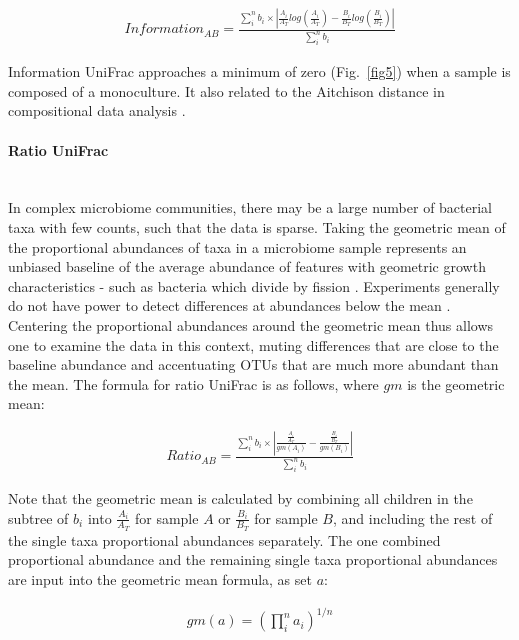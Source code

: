 \documentclass[10pt,letterpaper]{article}
\begin{document}
\begin{align*}
Information_{AB} = \frac{\sum_{i}^{n} b_{i} \times \left| \frac{A_{i}}{A_{T}}log\left(\frac{A_{i}}{A_{T}}\right) - \frac{B_{i}}{B_{T}}log\left(\frac{B_{i}}{B_{T}}\right) \right|}{\sum_{i}^{n} b_{i}}
\end{align*}

Information UniFrac approaches a minimum of zero (Fig.~\ref{fig5}) when a sample is composed of a monoculture. It also related to the Aitchison distance in compositional data analysis \cite{egozcue2011evidence}.

\paragraph{Ratio UniFrac}\mbox{}\\
In complex microbiome communities, there may be a large number of bacterial taxa with few counts, such that the data is sparse. Taking the geometric mean of the proportional abundances of taxa in a microbiome sample represents an unbiased baseline of the average abundance of features with geometric growth characteristics - such as bacteria which divide by fission \cite{aitchison1982statistical}. Experiments generally do not have power to detect differences at abundances below the mean \cite{fernandes2013anova}. Centering the proportional abundances around the geometric mean thus allows one to examine the data in this context, muting differences that are close to the baseline abundance and accentuating OTUs that are much more abundant than the mean. The formula for ratio UniFrac is as follows, where $gm$ is the geometric mean:

\begin{align*}
Ratio_{AB} = \frac{\sum_{i}^{n} b_{i} \times \left| \frac{\frac{A_{i}}{A_{T}}}{gm(A_{i})} - \frac{\frac{B_{i}}{B_{T}}}{{gm(B_{i})}} \right|}{\sum_{i}^{n} b_{i}}
\end{align*}

Note that the geometric mean is calculated by combining all children in the subtree of $b_{i}$ into $\frac{A_{i}}{A_{T}}$ for sample $A$ or $\frac{B_{i}}{B_{T}}$ for sample $B$, and including the rest of the single taxa proportional abundances separately. The one combined proportional abundance and the remaining single taxa proportional abundances are input into the geometric mean formula, as set $a$:

\begin{align*}
gm(a) = \left( \prod_{i}^{n} a_{i}\right)^{1/n}
\end{align*}
\end{document}
